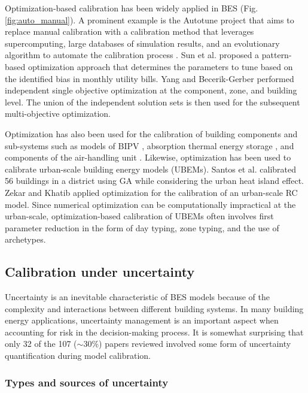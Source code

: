 \documentclass[review]{elsarticle}
\begin{document}
Optimization-based calibration has been widely applied in BES (Fig. \ref{fig:auto_manual}). A prominent example is the Autotune project that aims to replace manual calibration with a calibration method that leverages supercomputing, large databases of simulation results, and an evolutionary algorithm to automate the calibration process \cite{chaudhary2016evaluation, garrett2015scalable}. Sun et al. \cite{sun2016pattern} proposed a pattern-based optimization approach that determines the parameters to tune based on the identified bias in monthly utility bills. Yang and Becerik-Gerber \cite{yang2015model} performed independent single objective optimization at the component, zone, and building level. The union of the independent solution sets is then used for the subsequent multi-objective optimization. 

Optimization has also been used for the calibration of building components and sub-systems such as models of BIPV \cite{Ha2020parameter}, absorption thermal energy storage \cite{schreiber2018predicting}, and components of the air-handling unit \cite{larochellemartin2019energy}. Likewise, optimization has been used to calibrate urban-scale building energy models (UBEMs). Santos et al. \cite{santos2018evaluating} calibrated 56 buildings in a district using GA while considering the urban heat island effect. Zekar and Khatib \cite{zekar2018development} applied optimization for the calibration of an urban-scale RC model. Since numerical optimization can be computationally impractical at the urban-scale, optimization-based calibration of UBEMs often involves first parameter reduction in the form of day typing, zone typing, and the use of archetypes. 

\subsection{Calibration under uncertainty}

Uncertainty is an inevitable characteristic of BES models because of the complexity and interactions between different building systems. In many building energy applications, uncertainty management is an important aspect when accounting for risk in the decision-making process. It is somewhat surprising that only 32 of the 107 ($\sim$30\%) papers reviewed involved some form of uncertainty quantification during model calibration. 

\subsubsection{Types and sources of uncertainty}
\end{document}
